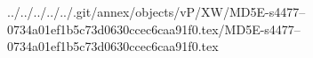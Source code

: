 ../../../../../.git/annex/objects/vP/XW/MD5E-s4477--0734a01ef1b5c73d0630ccec6caa91f0.tex/MD5E-s4477--0734a01ef1b5c73d0630ccec6caa91f0.tex
